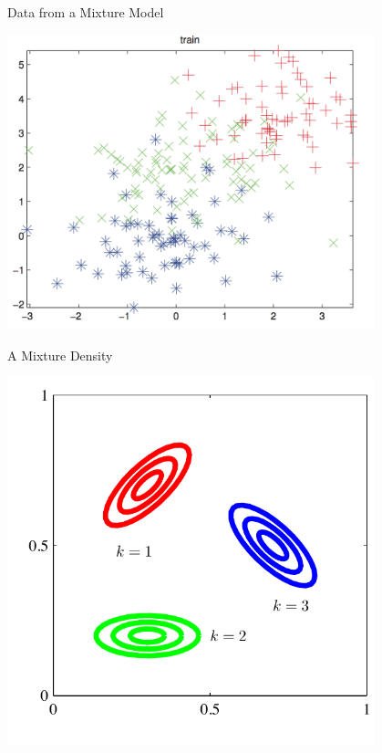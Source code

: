 \documentclass[11pt, mathserif, handout, table]{beamer}
\begin{document}
\begin{frame}{Data from a Mixture Model}
  \begin{center}
    \includegraphics[width=0.8\textwidth]{img/knn_data.png}
  \end{center}
\end{frame}

\begin{frame}{A Mixture Density}
  \begin{center}
    \includegraphics[width=0.8\textwidth]{img/mixture_density.pdf}
  \end{center}
\end{frame}
\end{document}
